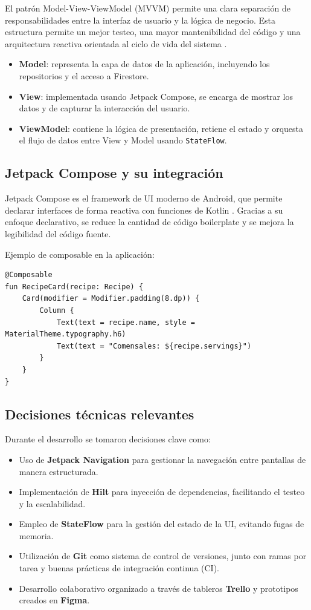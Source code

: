 El patrón Model-View-ViewModel (MVVM) permite una clara separación de responsabilidades entre la interfaz de usuario y la lógica de negocio. Esta estructura permite un mejor testeo, una mayor mantenibilidad del código y una arquitectura reactiva orientada al ciclo de vida del sistema \cite{viewmodel}.

\begin{itemize}
    \item \textbf{Model}: representa la capa de datos de la aplicación, incluyendo los repositorios y el acceso a Firestore.
    \item \textbf{View}: implementada usando Jetpack Compose, se encarga de mostrar los datos y de capturar la interacción del usuario.
    \item \textbf{ViewModel}: contiene la lógica de presentación, retiene el estado y orquesta el flujo de datos entre View y Model usando \texttt{StateFlow}.
\end{itemize}

\subsection{Jetpack Compose y su integraci\'on}

Jetpack Compose es el framework de UI moderno de Android, que permite declarar interfaces de forma reactiva con funciones de Kotlin \cite{jetpack}. Gracias a su enfoque declarativo, se reduce la cantidad de código boilerplate y se mejora la legibilidad del código fuente.

Ejemplo de composable en la aplicación:

\begin{verbatim}
@Composable
fun RecipeCard(recipe: Recipe) {
    Card(modifier = Modifier.padding(8.dp)) {
        Column {
            Text(text = recipe.name, style = MaterialTheme.typography.h6)
            Text(text = "Comensales: ${recipe.servings}")
        }
    }
}
\end{verbatim}

\subsection{Decisiones técnicas relevantes}

Durante el desarrollo se tomaron decisiones clave como:

\begin{itemize}
    \item Uso de \textbf{Jetpack Navigation} para gestionar la navegación entre pantallas de manera estructurada.
    \item Implementación de \textbf{Hilt} para inyección de dependencias, facilitando el testeo y la escalabilidad.
    \item Empleo de \textbf{StateFlow} para la gestión del estado de la UI, evitando fugas de memoria.
    \item Utilización de \textbf{Git} como sistema de control de versiones, junto con ramas por tarea y buenas prácticas de integración continua (CI).
    \item Desarrollo colaborativo organizado a través de tableros \textbf{Trello} y prototipos creados en \textbf{Figma}.
\end{itemize}

